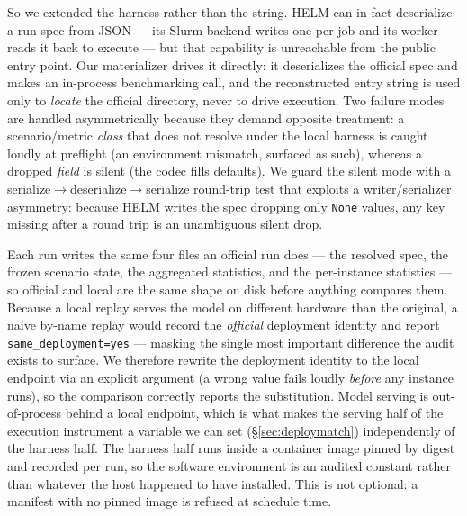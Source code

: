 So we extended the harness rather than the string. HELM can in fact deserialize a
run spec from JSON --- its Slurm backend writes one per job and its worker reads
it back to execute --- but that capability is unreachable from the public entry
point. Our materializer drives it directly: it deserializes the official spec and
makes an in-process benchmarking call, and the reconstructed entry string is used
only to \emph{locate} the official directory, never to drive execution. Two
failure modes are handled
asymmetrically because they demand opposite treatment: a scenario/metric
\emph{class} that does not resolve under the local harness is caught loudly at
preflight (an environment mismatch, surfaced as such), whereas a dropped
\emph{field} is silent (the codec fills defaults). We guard the silent mode with a
serialize$\to$deserialize$\to$serialize round-trip test that exploits a
writer/serializer asymmetry: because HELM writes the spec dropping only
\texttt{None} values, any key missing after a round trip is an unambiguous silent
drop.

Each run writes the same four files an official run does --- the resolved spec,
the frozen scenario state, the aggregated statistics, and the per-instance
statistics --- so official and local are the same shape on disk before anything
compares them. Because a local replay serves the model on different hardware than
the original, a naive by-name replay would record the \emph{official} deployment
identity and report \texttt{same\_deployment=yes} --- masking the single most
important difference the audit exists to surface. We therefore rewrite the
deployment identity to the local endpoint via an explicit argument (a wrong value
fails loudly \emph{before} any instance runs), so the comparison correctly reports
the substitution. Model serving is out-of-process behind a local endpoint, which
is what makes the serving half of the execution instrument a variable we can set
(\S\ref{sec:deploymatch}) independently of the harness half. The harness half runs
inside a container image pinned by digest and recorded per run, so the software
environment is an audited constant rather than whatever the host happened to have
installed. This is not optional: a manifest with no pinned image is refused at
schedule time.

